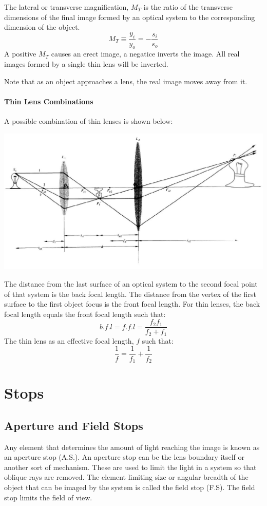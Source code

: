 \documentclass[12pt]{report}
\begin{document}
The lateral or transverse magnification, $M_T$ is the ratio of the transverse dimensions of the final image formed by an optical system to the corresponding dimension of the object. 
\begin{equation}
M_T \equiv \frac{y_i}{y_o} = -\frac{s_i}{s_o}
\end{equation}
A positive $M_T$ causes an erect image, a negatice inverts the image. All real images formed by a single thin lens will be inverted. 

Note that as an object approaches a lens, the real image moves away from it. 
\paragraph{Thin Lens Combinations}
A possible combination of thin lenses is shown below:

\includegraphics[scale=.45]{ThinLensCombo.jpg}

The distance from the last surface of an optical system to the second focal point of that system is the back focal length. The distance from the vertex of the first surface to the first object focus is the front focal length. For thin lenses, the back focal length equals the front focal length such that:
\[b.f.l = f. f.l = \frac{f_2f_1}{f_2+f_1}\]
The thin lens as an effective focal length, $f$ such that:
\begin{equation}
\frac{1}{f} = \frac{1}{f_1}+\frac{1}{f_2}
\end{equation}

\section{Stops}
\subsection{Aperture and Field Stops}
Any element that determines the amount of light reaching the image is known as an aperture stop (A.S.). An aperture stop can be the lens boundary itself or another sort of mechanism. These are used to limit the light in a system so that oblique rays are removed. The element limiting size or angular breadth of the object that can be imaged by the system is called the field stop (F.S). The field stop limits the field of view.  
\end{document}
